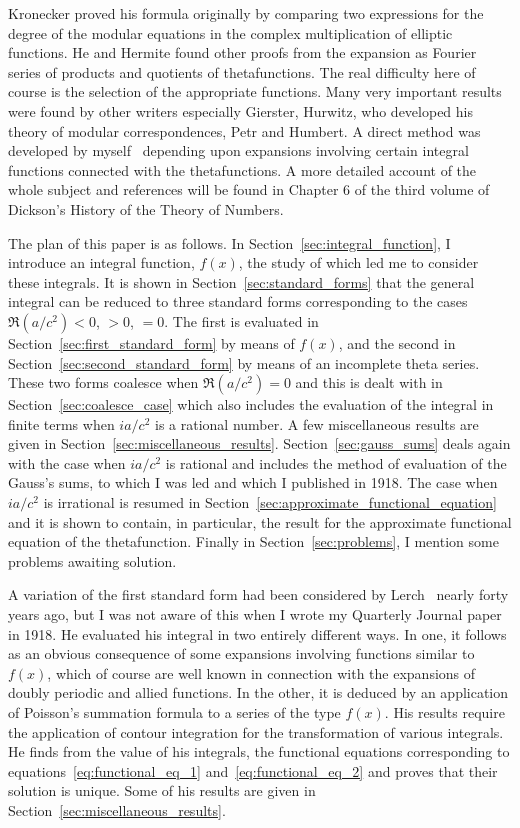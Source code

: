\documentclass[12pt]{article}
\theoremstyle{remark}
\begin{document}
Kronecker proved his formula originally by comparing two expressions for the degree of the modular equations in the complex multiplication of elliptic functions. He and Hermite found other proofs from the expansion as Fourier series of products and quotients of thetafunctions. The real difficulty here of course is the selection of the appropriate functions. Many very important results were found by other writers especially Gierster, Hurwitz, who developed his theory of modular correspondences, Petr and Humbert. A direct method was developed by myself~\cite{Mordell1916} depending upon expansions involving certain integral functions connected with the thetafunctions. A more detailed account of the whole subject and references will be found in Chapter 6 of the third volume of Dickson's History of the Theory of Numbers.

The plan of this paper is as follows. In Section~\ref{sec:integral_function}, I introduce an integral function, $f(x)$, the study of which led me to consider these integrals. It is shown in Section~\ref{sec:standard_forms} that the general integral can be reduced to three standard forms corresponding to the cases $\Re(a/c^2) < 0$, $> 0$, $= 0$. The first is evaluated in Section~\ref{sec:first_standard_form} by means of $f(x)$, and the second in Section~\ref{sec:second_standard_form} by means of an incomplete theta series. These two forms coalesce when $\Re(a/c^2) = 0$ and this is dealt with in Section~\ref{sec:coalesce_case} which also includes the evaluation of the integral in finite terms when $ia/c^2$ is a rational number. A few miscellaneous results are given in Section~\ref{sec:miscellaneous_results}. Section~\ref{sec:gauss_sums} deals again with the case when $ia/c^2$ is rational and includes the method of evaluation of the Gauss's sums, to which I was led and which I published in 1918. The case when $ia/c^2$ is irrational is resumed in Section~\ref{sec:approximate_functional_equation} and it is shown to contain, in particular, the result for the approximate functional equation of the thetafunction. Finally in Section~\ref{sec:problems}, I mention some problems awaiting solution.

A variation of the first standard form had been considered by Lerch~\cite{Lerch1892} nearly forty years ago, but I was not aware of this when I wrote my Quarterly Journal paper in 1918. He evaluated his integral in two entirely different ways. In one, it follows as an obvious consequence of some expansions involving functions similar to $f(x)$, which of course are well known in connection with the expansions of doubly periodic and allied functions. In the other, it is deduced by an application of Poisson's summation formula to a series of the type $f(x)$. His results require the application of contour integration for the transformation of various integrals. He finds from the value of his integrals, the functional equations corresponding to equations~\eqref{eq:functional_eq_1} and~\eqref{eq:functional_eq_2} and proves that their solution is unique. Some of his results are given in Section~\ref{sec:miscellaneous_results}.
\end{document}
